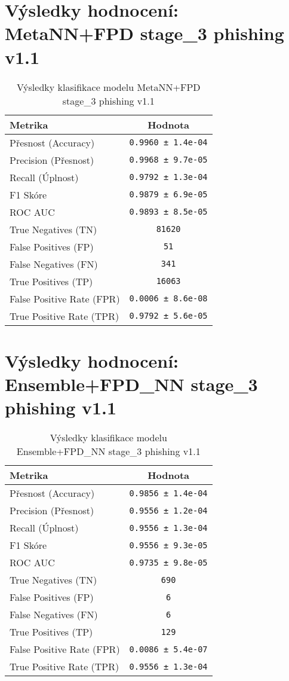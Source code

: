 \section*{Výsledky hodnocení: MetaNN+FPD stage_3 phishing v1.1}
\begin{table}[h!]
\centering
\begin{tabular}{|l|c|}
\hline
\textbf{Metrika} & \textbf{Hodnota} \\
\hline
Přesnost (Accuracy) & \texttt{0.9960 ± 1.4e-04} \\
Precision (Přesnost) & \texttt{0.9968 ± 9.7e-05} \\
Recall (Úplnost) & \texttt{0.9792 ± 1.3e-04} \\
F1 Skóre & \texttt{0.9879 ± 6.9e-05} \\
ROC AUC & \texttt{0.9893 ± 8.5e-05} \\
True Negatives (TN) & \texttt{81620} \\
False Positives (FP) & \texttt{51} \\
False Negatives (FN) & \texttt{341} \\
True Positives (TP) & \texttt{16063} \\
False Positive Rate (FPR) & \texttt{0.0006 ± 8.6e-08} \\
True Positive Rate (TPR) & \texttt{0.9792 ± 5.6e-05} \\
\hline
\end{tabular}
\caption{Výsledky klasifikace modelu MetaNN+FPD stage_3 phishing v1.1}
\label{tab:phishing_metann+fpd}
\end{table}

\section*{Výsledky hodnocení: Ensemble+FPD_NN stage_3 phishing v1.1}
\begin{table}[h!]
\centering
\begin{tabular}{|l|c|}
\hline
\textbf{Metrika} & \textbf{Hodnota} \\
\hline
Přesnost (Accuracy) & \texttt{0.9856 ± 1.4e-04} \\
Precision (Přesnost) & \texttt{0.9556 ± 1.2e-04} \\
Recall (Úplnost) & \texttt{0.9556 ± 1.3e-04} \\
F1 Skóre & \texttt{0.9556 ± 9.3e-05} \\
ROC AUC & \texttt{0.9735 ± 9.8e-05} \\
True Negatives (TN) & \texttt{690} \\
False Positives (FP) & \texttt{6} \\
False Negatives (FN) & \texttt{6} \\
True Positives (TP) & \texttt{129} \\
False Positive Rate (FPR) & \texttt{0.0086 ± 5.4e-07} \\
True Positive Rate (TPR) & \texttt{0.9556 ± 1.3e-04} \\
\hline
\end{tabular}
\caption{Výsledky klasifikace modelu Ensemble+FPD_NN stage_3 phishing v1.1}
\label{tab:phishing_ensemble+fpd_nn}
\end{table}

